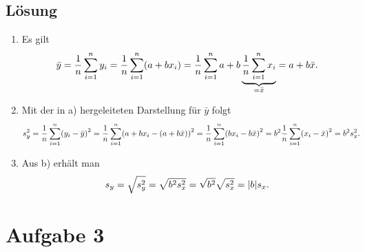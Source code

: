 \documentclass{exercise}
\begin{document}
    \subsection*{Lösung}
    \begin{enumerate}
        \item Es gilt
        \[
            \bar{y} = \frac{1}{n}\sum_{i = 1}^n y_i = \frac{1}{n}\sum_{i = 1}^n \parentheses*{a + bx_i} = \frac{1}{n}\sum_{i = 1}^n a + b\underbrace{\frac{1}{n}\sum_{i = 1}^n x_i}_{= \bar{x}} = a + b\bar{x}.
        \]
        \item Mit der in a) hergeleiteten Darstellung für \(\bar{y}\) folgt
        \begin{align*}
            s_y^2 &= \frac{1}{n}\sum_{i = 1}^n \parentheses*{y_i - \bar{y}}^2 = \frac{1}{n}\sum_{i = 1}^n\parentheses*{a + bx_i - \parentheses*{a + b\bar{x}}}^2 = \frac{1}{n}\sum_{i = 1}^n\parentheses*{bx_i - b\bar{x}}^2 = b^2\frac{1}{n}\sum_{i = 1}^n\parentheses*{x_i - \bar{x}}^2 = b^2 s_x^2.
        \end{align*}
        \item Aus b) erhält man
        \[
            s_y = \sqrt{s_y^2} = \sqrt{b^2 s_x^2} = \sqrt{b^2}\sqrt{s_x^2} = \absolute*{b}s_x.
        \]
    \end{enumerate}


    \section*{Aufgabe 3}
\end{document}
